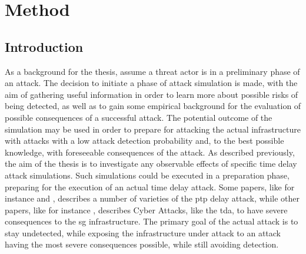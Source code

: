 \chapter{Method} 

\section{Introduction}

As a background for the thesis, assume a threat actor is
 in a preliminary phase of an attack. The decision to initiate a phase of attack simulation is made, with the aim of gathering useful information in order to learn more about possible risks of being detected, as well as to gain some empirical background for the evaluation of possible consequences of a successful attack.
The potential outcome of the simulation may be used in order to prepare for attacking the actual infrastructure with attacks with a low attack detection probability and, to the best possible knowledge, with foreseeable consequences of the attack.
As described previously, the aim of the thesis is to investigate any observable effects of specific time delay attack simulations. Such simulations could be executed in a preparation phase, preparing for the execution of an actual time delay attack.
 Some papers, like for instance  \cite{ullmann2009delay} and \cite{alghamdi2017advanced}, describes a number of varieties of the \acrshort{ptp} delay attack, while other papers, like for instance \cite{de2020evaluation}, describes Cyber Attacks, like the \acrlong{tda}, to have severe consequences to the \acrshort{sg} infrastructure. The primary goal of the actual attack is to stay undetected, while exposing the infrastructure under attack to an attack having the most severe consequences possible, while still avoiding detection.  
 








